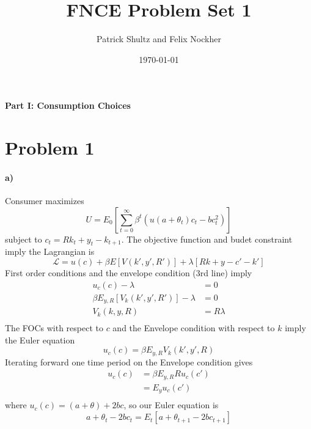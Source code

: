 \documentclass[12pt,letter]{article}
\begin{document}
\title{FNCE Problem Set 1}
\author{Patrick Shultz and Felix Nockher}
\date{\today}
\maketitle 
\textbf{Part I: Consumption Choices}
\section*{Problem 1}
\paragraph{a)}
Consumer maximizes
\begin{equation*}
	U = E_0\left[ \sum_{t = 0}^{\infty} \beta^t( u(a+ \theta_t)c_t - bc_t^2)\right] 
\end{equation*}
subject to $c_t = Rk_t + y_t - k_{t+1}$. The objective function and budet constraint imply the Lagrangian is
\begin{equation}
	\mathcal{L} = u(c) +\beta E\left[V(k', y', R') \right] + \lambda \left[Rk + y - c'-k' \right]  
\end{equation}
First order conditions and the envelope condition (3rd line) imply
\begin{equation}
	\begin{split}
	 u_c(c) - \lambda &=0\\
	\beta E_{y, R}\left[ V_k(k', y', R')\right]-\lambda &= 0\\
	 V_k(k, y, R) &= R\lambda\\  
	\end{split}
\end{equation}
The FOCs with respect to $c$ and the Envelope condition with respect to $k$ imply the Euler equation 
\begin{equation}
	u_c(c) = \beta E_{y, R} V_k(k', y', R)
\end{equation}
Iterating forward one time period on the Envelope condition gives
\begin{equation}
\begin{split}
u_c(c) &= \beta E_{y, R} R u_c(c')\\
&= E_{y} u_c(c')\\
\end{split}
\end{equation}
where $u_c(c) = (a+\theta) + 2bc$, so our Euler equation is 
\begin{equation}
a + \theta_t - 2bc_t = E_t\left[a + \theta_{t+1} -2bc_{t+1} \right]  
\end{equation}
\end{document}
